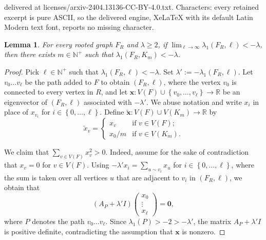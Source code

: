 \documentclass[10pt,a4paper]{amsart}
\newtheorem{lemma}[theorem]{Lemma}
\newcommand{\N}{\mathbb{N}}
\newcommand{\R}{\mathbb{R}}
\newcommand{\bx}{\bm{x}}
\newcommand{\la}{\lambda}
\newcommand{\sset}[1]{\left\{{#1}\right\}}
\newcommand{\tbx}{\tilde{\bm{x}}}
\begin{document}
delivered at licenses/arxiv-2404.13136-CC-BY-4.0.txt. Characters: every retained excerpt is pure ASCII, so the delivered engine, XeLaTeX with its default Latin Modern text font, reports no missing character.
\begin{lemma} \label{lem:clique-extension}
    For every rooted graph $F_R$ and $\la \ge 2$, if $\lim_{\ell\to\infty} \la_1(F_R, \ell) < -\la$, then there exists $m \in \N^+$ such that $\la_1(F_R, K_m) < -\la$.
\end{lemma}

\begin{proof}
    Pick $\ell \in \N^+$ such that $\la_1(F_R, \ell) < -\la$. Set $\la' := -\la_1(F_R, \ell)$. Let $v_0\dots v_\ell$ be the path added to $F$ to obtain $(F_R, \ell)$, where the vertex $v_0$ is connected to every vertex in $R$, and let $\bx\colon V(F) \cup \sset{v_0, \dots, v_\ell} \to \R$ be an eigenvector of $(F_R, \ell)$ associated with $-\la'$. We abuse notation and write $x_i$ in place of $x_{v_i}$ for $i \in \sset{0,\dots, \ell}$. Define $\tbx \colon V(F) \cup V(K_m) \to \R$ by
    \[
        \tilde{x}_v = \begin{cases}
            x_v & \text{if }v \in V(F); \\
            x_0/m  & \text{if }v \in V(K_m).
        \end{cases}
    \]

    We claim that $\sum_{v \in V(F)}x_v^2 > 0$. Indeed, assume for the sake of contradiction that $x_v = 0$ for $v \in V(F)$. Using $-\la' x_i = \sum_{u\sim v_i}x_u$ for $i \in \sset{0, \dots, \ell}$, where the sum is taken over all vertices $u$ that are adjacent to $v_i$ in $(F_R, \ell)$, we obtain that \[
        (A_P + \la' I)\begin{pmatrix}
            x_0 \\
            \vdots \\
            x_\ell
        \end{pmatrix} = \bm{0},
    \]
    where $P$ denotes the path $v_0\dots v_\ell$. Since $\la_1(P) > -2 > -\la'$, the matrix $A_P + \la' I$ is positive definite, contradicting the assumption that $\bx$ is nonzero.


\end{proof}
\end{document}
